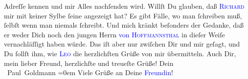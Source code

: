                Adreſſe kennen und mir Alles nachſenden wird.\pend
           \pstart
           Willſt Du glauben, daß \textsc{\textcolor{blue}{Richard}{}\ledrightnote{\textcolor{blue}{Richard Beer-Hofmann}}} mir mit keiner Sylbe ſeine \label{K_L02854-7v}\label{K_L02854-7h} angezeigt hat? Es gibt Fälle, wo man ſchreiben muß, ſelbſt wenn man niemals
               ſchreibt. Und mich kränkt {\pb}beſonders der Gedanke,
               daß er weder Dich noch den jungen Herrn \textcolor{blue}{von \textsc{Hoffmannsthal}}{}\ledrightnote{\textcolor{blue}{Hugo von Hofmannsthal}} in dieſer Weiſe vernachläſſigt haben würde. \label{K_L02854-11v}\label{K_L02854-11h}\pend
           \pstart
           Das iſt aber nur zwiſchen Dir und mir geſagt, und Du ſollſt ihm, wie \textsc{\textcolor{blue}{Leo}{}\ledrightnote{\textcolor{blue}{Leo Van-Jung}}}
                die herzlichſten Grüße von mir übermitteln.\pend
           \pstart
           Auch Dir, mein lieber Freund, herzlichſte und treueſte Grüße!\pend
           \pstart
           Dein{\\[\baselineskip]}\spacefill\mbox{ Paul Goldmann}\pend
           \leftskip=0em{}\pstart
           \noindent{}Viele Grüße an Deine \textcolor{blue}{Freundin}{}!\pend
           \endnumbering{}\begin{anhang}\end{anhang}
      